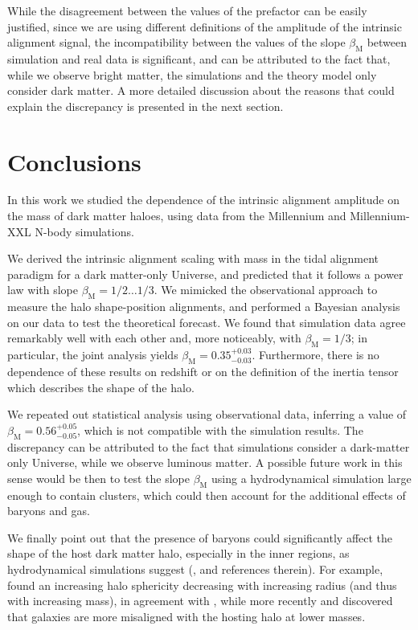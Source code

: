 \documentclass[a4paper,11pt]{article}
\begin{document}
While the disagreement between the values of the prefactor can be easily justified, since we are using different definitions of the amplitude of the intrinsic alignment signal, the incompatibility between the values of the slope $\beta_{\mathrm{M}}$ between simulation and real data is significant, and can be attributed to the fact that, while we observe bright matter, the simulations and the theory model only consider dark matter. A more detailed discussion about the reasons that could explain the discrepancy is presented in the next section.

\section{Conclusions}
In this work we studied the dependence of the intrinsic alignment amplitude on the mass of dark matter haloes, using data from the Millennium and Millennium-XXL N-body simulations.

We derived the intrinsic alignment scaling with mass in the tidal alignment paradigm for a dark matter-only Universe, and predicted that it follows a power law with slope $\beta_{\mathrm{M}} = 1/2\ldots 1/3$. We mimicked the observational approach to measure the halo shape-position alignments, and performed a Bayesian analysis on our data to test the theoretical forecast. We found that simulation data agree remarkably well with each other and, more noticeably, with $\beta_{\mathrm{M}} = 1/3$; in particular, the joint analysis yields $\beta_{\mathrm{M}} = 0.35^{+0.03}_{-0.03}$. Furthermore, there is no dependence of these results on redshift or on the definition of the inertia tensor which describes the shape of the halo. 

We repeated out statistical analysis using observational data, inferring a value of $\beta_{\mathrm{M}} = 0.56^{+0.05}_{-0.05}$, which is not compatible with the simulation results. The discrepancy can be attributed to the fact that simulations consider a dark-matter only Universe, while we observe luminous matter. A possible future work in this sense would be then to test the slope $\beta_{\mathrm{M}}$ using a hydrodynamical simulation large enough to contain clusters, which could then account for the additional effects of baryons and gas.

We finally point out that the presence of baryons could significantly affect the shape of the host dark matter halo, especially in the inner regions, as hydrodynamical simulations suggest (\cite{Kiesslingetal2015}, and references therein). For example, \cite{Bailinetal2005} found an increasing halo sphericity decreasing with increasing radius (and thus with increasing mass), in agreement with \cite{Kazantzidisetal2004}, while more recently \cite{Tennetietal2014} and \cite{Velliscigetal2015a} discovered that galaxies are more misaligned with the hosting halo at lower masses.
\end{document}
